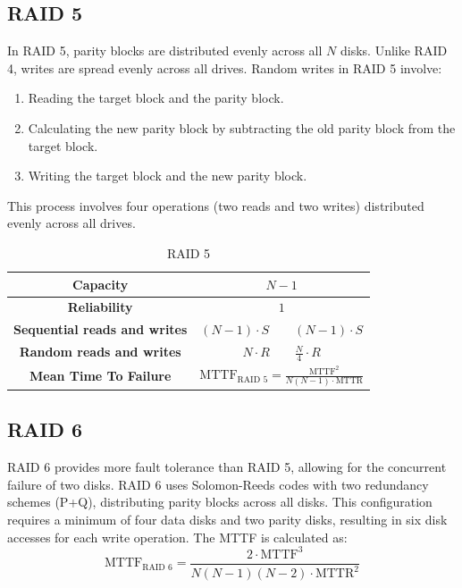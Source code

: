 \subsection{RAID 5}
In RAID 5, parity blocks are distributed evenly across all $N$ disks. 
Unlike RAID 4, writes are spread evenly across all drives. 
Random writes in RAID 5 involve:
\begin{enumerate}
    \item Reading the target block and the parity block.
    \item Calculating the new parity block by subtracting the old parity block from the target block.
    \item Writing the target block and the new parity block.
\end{enumerate}
This process involves four operations (two reads and two writes) distributed evenly across all drives.
\begin{table}[H]
    \centering
    \begin{tabular}{|cc|}
    \hline
    \textbf{Capacity}                    & $N-1$                                                                       \\ \hline
    \textbf{Reliability}                 & $1$                                                                         \\ \hline
    \textbf{Sequential reads and writes} & $(N-1)\cdot S \qquad (N-1)\cdot S$                                          \\ \hline
    \textbf{Random reads and writes}     & $N\cdot R \qquad \frac{N}{4}\cdot R$                                        \\ \hline
    \textbf{Mean Time To Failure}        & $\text{MTTF}_{\text{RAID }5}=\frac{\text{MTTF}^2}{N(N-1)\cdot \text{MTTR}}$ \\ \hline
    \end{tabular}
    \caption{RAID 5}
\end{table}

\subsection{RAID 6}
RAID 6 provides more fault tolerance than RAID 5, allowing for the concurrent failure of two disks. 
RAID 6 uses Solomon-Reeds codes with two redundancy schemes (P+Q), distributing parity blocks across all disks. 
This configuration requires a minimum of four data disks and two parity disks, resulting in six disk accesses for each write operation. 
The MTTF is calculated as:
\[\text{MTTF}_{\text{RAID }6}=\frac{2\cdot\text{MTTF}^3}{N(N-1)(N-2)\cdot \text{MTTR}^2}\]

